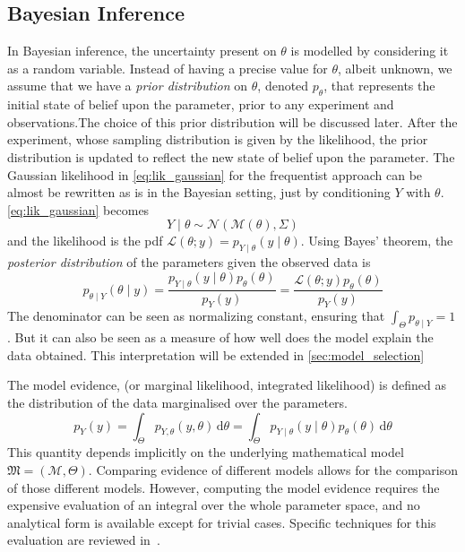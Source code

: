 \documentclass[../../Main_ManuscritThese.tex]{subfiles}
\begin{document}
\subsection{Bayesian Inference}
\label{sec:bayesian_inference_MAP}
In Bayesian inference, the uncertainty present on $\theta$ is modelled by considering it as a random variable. Instead of having a precise value for $\theta$, albeit unknown, we assume that we have a \emph{prior distribution} on $\theta$, denoted $p_{\theta}$, that represents the initial state of belief upon the parameter, prior to any experiment and observations.The choice of this prior distribution will be discussed later.
After the experiment, whose sampling distribution is given by the likelihood, the prior distribution is updated to reflect the new state of belief upon the parameter. 
The Gaussian likelihood in \cref{eq:lik_gaussian} for the frequentist approach can be almost be rewritten as is in the Bayesian setting, just by conditioning $Y$ with $\theta$.
\cref{eq:lik_gaussian} becomes
\begin{equation}
  Y \mid  \theta \sim \mathcal{N}(\mathcal{M}(\theta), \Sigma)
\end{equation}
and the likelihood is the pdf $\mathcal{L}(\theta;y) = p_{Y\mid \theta}(y \mid  \theta)$.
Using Bayes' theorem, the \emph{posterior distribution} of the parameters given the observed data is
\begin{equation}
  \label{eq:bayes_posterior}
  p_{\theta \mid Y}(\theta \mid y) = \frac{p_{Y\mid \theta}(y \mid  \theta)p_{\theta}(\theta)}{p_Y(y)} = \frac{\mathcal{L}(\theta;y)p_{\theta}(\theta)}{p_Y(y)}
\end{equation}
The denominator can be seen as normalizing constant, ensuring that $\int_{\Theta} p_{\theta \mid Y} = 1$. But it can also be seen as a measure of how well does the model explain the data obtained. This interpretation will be extended in \cref{sec:model_selection}
\begin{definition}
\label{def:model_evidence}
  The model evidence, (or marginal likelihood, integrated likelihood) is defined as the distribution of the data marginalised over the parameters.
  \begin{equation}
    \label{eq:model_evidence}
    p_Y(y) = \int_{\Theta}p_{Y,\theta}(y,\theta)\,\mathrm{d}\theta = \int_{\Theta}p_{Y \mid \theta}(y \mid \theta)p_{\theta}(\theta)\,\mathrm{d}\theta
  \end{equation}
  This quantity depends implicitly on the underlying mathematical model $\mathfrak{M} = (\mathcal{M},\Theta)$. Comparing evidence of different models allows for the comparison of those different models. However, computing the model evidence requires the expensive evaluation of an integral over the whole parameter space, and no analytical form is available except for trivial cases. Specific techniques for this evaluation are reviewed in~\cite{friel_estimating_2011}.
\end{definition}
\end{document}
